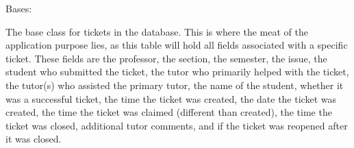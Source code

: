 \documentclass[letterpaper,10pt,english]{sphinxmanual}
\begin{document}
\begin{fulllineitems}
\label{\detokenize{models/ticket:api.models.ticket.Ticket}}
\pysigstartsignatures
{}
\pysigstopsignatures
\sphinxAtStartPar
Bases: 

\sphinxAtStartPar
The base class for tickets in the database. This is where the meat of the
application purpose lies, as this table will hold all fields associated
with a specific ticket. These fields are the professor, the section, the
semester, the issue, the student who submitted the ticket, the tutor who
primarily helped with the ticket, the tutor(s) who assisted the primary
tutor, the name of the student, whether it was a successful ticket,
the time the ticket was created, the date the ticket was created, the
time the ticket was claimed (different than created), the time the
ticket was closed, additional tutor comments, and if the ticket was
reopened after it was closed.

\begin{fulllineitems}
\label{\detokenize{models/ticket:api.models.ticket.Ticket.CLOSED}}
\pysigstartsignatures
{}
\pysigstopsignatures
\end{fulllineitems}


\begin{fulllineitems}
\label{\detokenize{models/ticket:api.models.ticket.Ticket.DIFFICULTY_CHOICES}}
\pysigstartsignatures
{}
\pysigstopsignatures
\end{fulllineitems}


\end{fulllineitems}
\end{document}
